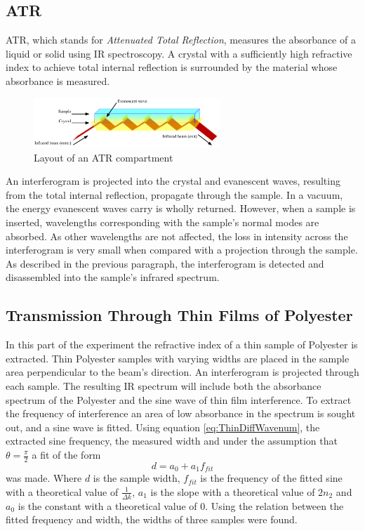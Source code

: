 \documentclass[reprint,amsmath,amssymb,aps, prl]{revtex4-2}
\begin{document}
\subsection{ATR}
ATR, which stands for \emph{Attenuated Total Reflection}, measures the absorbance of a liquid or solid using IR spectroscopy. A crystal with a sufficiently high refractive index to achieve total internal reflection is surrounded by the material whose absorbance is measured. 
\begin{figure}[h]
    \includegraphics[width=7cm]{Images/ATR.png}
    \caption{Layout of an ATR compartment \cite{wiki:ATR}}
    \label{fig:ATR}
    \centering
\end{figure}
An interferogram is projected into the crystal and evanescent waves, resulting from the total internal reflection, propagate through the sample. In a vacuum, the energy evanescent waves carry is wholly returned. However, when a sample is inserted, wavelengths corresponding with the sample's normal modes are absorbed. As other wavelengths are not affected, the loss in intensity across the interferogram is very small when compared with a projection through the sample. As described in the previous paragraph, the interferogram is detected and disassembled into the sample's infrared spectrum.

\subsection{Transmission Through Thin Films of Polyester}
In this part of the experiment the refractive index of a thin sample of Polyester is extracted. Thin Polyester samples with varying widths are placed in the sample area perpendicular to the beam's direction. An interferogram is projected through each sample. The resulting IR spectrum will include both the absorbance spectrum of the Polyester and the sine wave of thin film interference. To extract the frequency of interference an area of low absorbance in the spectrum is sought out, and a sine wave is fitted.  Using equation \ref{eq:ThinDiffWavenum}, the extracted sine frequency, the measured width and under the assumption that $\theta =\frac{\pi}{2}$ a fit of the form
\begin{equation}
    \label{eq:ThinLinFit}
    d=a_{0}+a_{1}f_{fit}
\end{equation}
was made. Where $d$ is the sample width, $f_{fit}$ is the frequency of the fitted sine with a theoretical value of $\frac{1}{\Delta k}$, $a_{1}$ is the slope with a theoretical value of $2n_{2}$ and $a_{0}$ is the constant with a theoretical value of 0. Using the relation between the fitted frequency and width, the widths of three samples were found.
\end{document}
